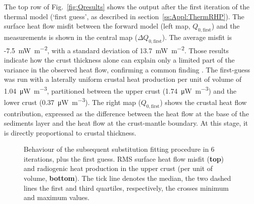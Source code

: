 The top row of Fig.~\ref{fig:Qresults} shows the output after the first iteration of the thermal model (`first guess', as described in section~\ref{ss:Appl:ThermRHP}).
The surface heat flow misfit between the forward model (left map, $Q_{0,\mathrm{first}}$) and the measurements is shown in the central map ($\Delta Q_{0,\mathrm{first}}$).
The average misfit is -7.5~\si{\milli \watt \per \square \metre}, with a standard deviation of 13.7~\si{\milli \watt \per \square \metre}.
Those results indicate how the crust thickness alone can explain only a limited part of the variance in the observed heat flow, confirming a common finding \parencite[e.g. ][]{Jaupart2016}.
The first-guess was run with a laterally uniform crustal heat production per unit of volume of \SI{1.04}{\micro \watt \per \cubic \metre}, partitioned between the upper crust (\SI{1.74}{\micro \watt \per \cubic \metre}) and the lower crust (\SI{0.37}{\micro \watt \per \cubic \metre}).
The right map ($Q_{0,\mathrm{first}}$) shows the crustal heat flow contribution, expressed as the difference between the heat flow at the base of the sediments layer and the heat flow at the crust-mantle boundary. 
At this stage, it is directly proportional to crustal thickness.

\begin{figure}
	\begin{adjustbox}{center}
	\end{adjustbox}
	\caption[Behaviour of the subsequent substitution fitting procedure in 6 iterations, plus the first guess.]{Behaviour of the subsequent substitution fitting procedure in 6 iterations, plus the first guess. RMS surface heat flow misfit (\textbf{top}) and radiogenic heat production in the upper crust (per unit of volume, \textbf{bottom}). The tick line denotes the median, the two dashed lines the first and third quartiles, respectively, the crosses minimum and maximum values.}
	\label{fig:RMSvsITN}
\end{figure}

